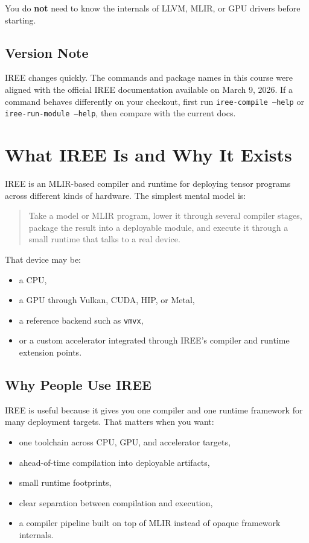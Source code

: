 \documentclass[11pt,a4paper]{article}
\begin{document}
You do \textbf{not} need to know the internals of LLVM, MLIR, or GPU drivers before starting.

\subsection{Version Note}

IREE changes quickly. The commands and package names in this course were aligned with the official IREE documentation available on March 9, 2026. If a command behaves differently on your checkout, first run \texttt{iree-compile --help} or \texttt{iree-run-module --help}, then compare with the current docs.

\section{What IREE Is and Why It Exists}

IREE is an MLIR-based compiler and runtime for deploying tensor programs across different kinds of hardware. The simplest mental model is:

\begin{quote}
Take a model or MLIR program, lower it through several compiler stages, package the result into a deployable module, and execute it through a small runtime that talks to a real device.
\end{quote}

That device may be:
\begin{itemize}
    \item a CPU,
    \item a GPU through Vulkan, CUDA, HIP, or Metal,
    \item a reference backend such as \texttt{vmvx},
    \item or a custom accelerator integrated through IREE's compiler and runtime extension points.
\end{itemize}

\subsection{Why People Use IREE}

IREE is useful because it gives you one compiler and one runtime framework for many deployment targets. That matters when you want:
\begin{itemize}
    \item one toolchain across CPU, GPU, and accelerator targets,
    \item ahead-of-time compilation into deployable artifacts,
    \item small runtime footprints,
    \item clear separation between compilation and execution,
    \item a compiler pipeline built on top of MLIR instead of opaque framework internals.
\end{itemize}
\end{document}
